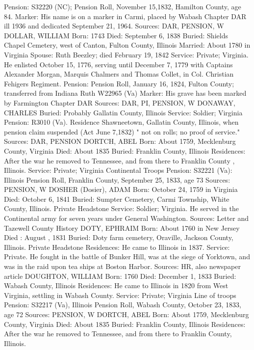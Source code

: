 Pension: S32220 (NC); Pension Roll, November 15,1832, Hamilton County, age 84. 
Marker: His name is on a marker in Carmi, placed by Wabash Chapter DAR ill 1936 and dedicated September 21, 1964. 
Sources: DAR, PENSION, W
DOLLAR, WILLIAM
Born: 1743 
Died: September 6, 1838 
Buried: Shields Chapel Cemetery, west of Canton, Fulton County, Illinois 
Married: About 1780 in Virginia 
Spouse: Ruth Beezley; died February 19, 1842 
Service: Private; Virginia. He enlisted October 15, 1776, serving until December 
7, 1779 with Captains Alexander Morgan, Marquis Chalmers and Thomas Collet, in Col. Christian Fehigers Regiment. 
Pension: Pension Roll, January 16, 1824, Fulton County; transferred from Indiana Ruth W22965 (Va)
Marker: His grave has been marked by Farmington Chapter DAR 
Sources: DAR, PI, PENSION, W
DONAWAY, CHARLES 
Buried: Probably Gallatin County, Illinois 
Service: Soldier; Virginia Pension: R3010 (Va). Residence Shawneetown, Gallatin County, Illinois, when pension claim suspended (Act June 7,1832) " not on rolls; no proof of service." 
Sources: DAR, PENSION 
DORTCH, ABEL 
Born: About 1759, Mecklenburg County, Virginia 
Died: About 1835 Buried: Franklin County, Illinois 
Residences: After the war he removed to Tennessee, and from there to Franklin County , Illinois. Service: Private; Virginia Continental Troops 
Pension: S32221 (Va): Illinois Pension Roll, Franklin County, September 25, 1833, age 73 
Sources: PENSION, W 
DOSHER (Dosier), ADAM
Born: October 24, 1759 in Virginia 
Died: October 6, 1841 
Buried: Sumpter Cemetery, Carmi Township, White County, Illinois. Private Headstone 
Service: Soldier; Virginia. He served in the Continental army for seven years under General Washington. 
Sources: Letter and Tazewell County History 
DOTY, EPHRAIM 
Born: About 1760 in New Jersey 
Died : August , 1831 
Buried: Doty farm cemetery, Oraville, Jackson County, Illinois. Private Headstone 
Residences: He came to Illinois in 1837. 
Service: Private. He fought in the battle of Bunker Hill, was at the siege of Yorktown, and was in the raid upon tea ships at Boston Harbor. 
Sources: HR, also newspaper article 
DOUGHTON, WILLIAM 
Born: 1760 Died: December 1, 1833 
Buried: Wabash County, Illinois 
Residences: He came to Illinois in 1820 from West Virginia, settling in Wabash County. 
Service: Private; Virginia Line of troops Pension: S32217 (Va), Illinois Pension Roll, Wabash County, October 23, 1833, age 72 
Sources: PENSION, W 
DORTCH, ABEL 
Born: About 1759, Mecklenburg County, Virginia 
Died: About 1835 
Buried: Franklin County, Illinois 
Residences: After the war he removed to Tennessee, and from there to Franklin County, Illinois. 
